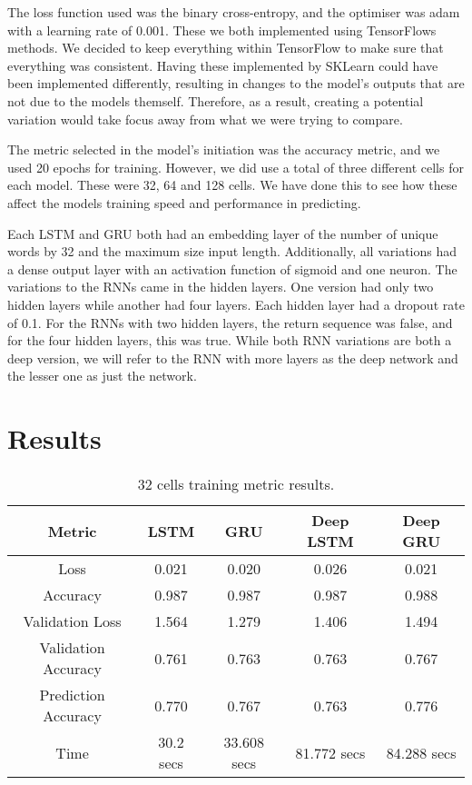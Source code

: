 \documentclass[a4paper,10pt]{article}
\begin{document}
	The loss function used was the binary cross-entropy, and the optimiser was adam with a learning rate of 0.001. These we both implemented using TensorFlows methods. We decided to keep everything within TensorFlow to make sure that everything was consistent. Having these implemented by SKLearn could have been implemented differently, resulting in changes to the model's outputs that are not due to the models themself. Therefore, as a result, creating a potential variation would take focus away from what we were trying to compare.
	
	The metric selected in the model's initiation was the accuracy metric, and we used 20 epochs for training. However, we did use a total of three different cells for each model. These were 32, 64 and 128 cells. We have done this to see how these affect the models training speed and performance in predicting.  
	
	Each LSTM and GRU both had an embedding layer of the number of unique words by 32 and the maximum size input length. Additionally, all variations had a dense output layer with an activation function of sigmoid and one neuron. The variations to the RNNs came in the hidden layers. One version had only two hidden layers while another had four layers. Each hidden layer had a dropout rate of 0.1. For the RNNs with two hidden layers, the return sequence was false, and for the four hidden layers, this was true. While both RNN variations are both a deep version, we will refer to the RNN with more layers as the deep network and the lesser one as just the network.
	

\section{Results}
	
	\begin{table}[t]
		\centering
		\small
		\begin{tabular}[t]{ | c | c | c | c | c | }
			\hline
			Metric          & LSTM  & GRU   & Deep LSTM & Deep GRU \\ 
			\hline
			Loss            & 0.021 & 0.020 & 0.026     & 0.021 \\ 
			\hline
			Accuracy        & 0.987 & 0.987 & 0.987     & 0.988  \\ 
			\hline
			Validation Loss & 1.564 & 1.279 & 1.406 & 1.494 \\
			\hline
			Validation Accuracy & 0.761 & 0.763 & 0.763 & 0.767 \\
			\hline
			Prediction Accuracy & 0.770     & 0.767 & 0.763     & 0.776 \\
			\hline 
			Time & 30.2 secs & 33.608 secs & 81.772 secs & 84.288 secs \\ 
			\hline
		\end{tabular}
		\caption{32 cells training metric results.}
		\label{tab:32_metrics}
	\end{table}%
\end{document}
